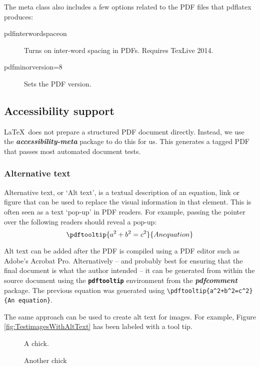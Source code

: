 \documentclass[12pt,letterpaper]{article}
\newcommand{\packagename}[1]{\textbf{\emph{#1}}}
\newcommand{\envname}[1]{\textbf{\texttt{#1}}}
\begin{document}
The meta class also includes a few options related to the PDF files that pdflatex produces:
\begin{description}
\item[pdfinterwordspaceon]{Turns on inter-word spacing in PDFs. Requires TexLive 2014.}
\item[pdfminorversion=8]{Sets the PDF version.}
\end{description}

\subsection{Accessibility support}
\LaTeX\ does not prepare a structured PDF document directly. Instead, we use the \packagename{accessibility-meta} package to do this for us. This generates a tagged PDF that passes most automated document tests.

\subsubsection{Alternative text}\label{sec:Alttext}
Alternative text, or `Alt text', is a textual description of an equation, link or figure that can be used to replace the visual information in that element. This is often seen as a text `pop-up' in PDF readers. For example, passing the pointer over the following readers should reveal a pop-up:
\begin{equation}
\pdftooltip{a^2+b^2=c^2}{An equation}
\end{equation}

Alt text can be added after the PDF is compiled using a PDF editor such as Adobe's Acrobat Pro. Alternatively -- and probably best for ensuring that the final document is what the author intended -- it can be generated from within the source document using the \envname{pdftooltip} environment from the \packagename{pdfcomment} package. The previous equation was generated using \verb?\pdftooltip{a^2+b^2=c^2}{An equation}?.

The same approach can be used to create alt text for images. For example, Figure \ref{fig:TestimagesWithAltText} has been labeled with a tool tip. 

\begin{figure*}
          \begin{subfigure}[b]{.55\linewidth}
            \centering
		{}
            \caption{A chick.}\label{fig:ChickWithAltText}
          \end{subfigure}%
          \begin{subfigure}[b]{.55\linewidth}
            \centering
		{}
            \caption{Another chick}\label{fig:ChickWithAltText2}
          \end{subfigure}
          \caption{Test images}\label{fig:TestimagesWithAltText}
\end{figure*}
\end{document}
